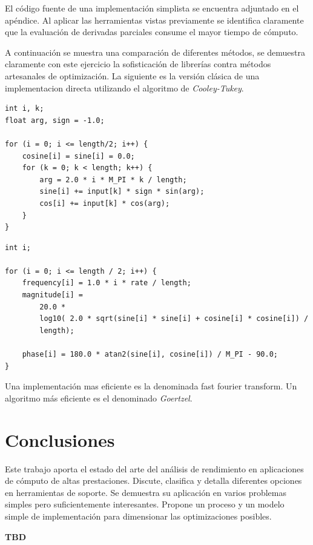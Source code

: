 \documentclass[a4paper]{report}
\begin{document}
El c\'odigo fuente de una implementaci\'on simplista se encuentra adjuntado en
el ap\'endice. Al aplicar las herramientas vistas previamente se identifica
claramente que la evaluaci\'on de derivadas parciales consume el mayor tiempo
de c\'omputo.

\bigskip

A continuaci\'on se muestra una comparaci\'on de diferentes m\'etodos, se
demuestra claramente con este ejercicio la sofisticaci\'on de librer\'ias
contra m\'etodos artesanales de optimizaci\'on. La siguiente es la versi\'on
cl\'asica de una implementacion directa utilizando el algoritmo de
{\it Cooley-Tukey}.

\begin{verbatim}
int i, k;
float arg, sign = -1.0;

for (i = 0; i <= length/2; i++) {
    cosine[i] = sine[i] = 0.0;
    for (k = 0; k < length; k++) {
        arg = 2.0 * i * M_PI * k / length;
        sine[i] += input[k] * sign * sin(arg);
        cos[i] += input[k] * cos(arg);
    }
}
\end{verbatim}

\begin{verbatim}
int i;

for (i = 0; i <= length / 2; i++) {
    frequency[i] = 1.0 * i * rate / length;
    magnitude[i] =
        20.0 *
        log10( 2.0 * sqrt(sine[i] * sine[i] + cosine[i] * cosine[i]) /
        length);

    phase[i] = 180.0 * atan2(sine[i], cosine[i]) / M_PI - 90.0;
}
\end{verbatim}

Una implementaci\'on mas eficiente es la denominada fast fourier transform.
Un algoritmo m\'as eficiente es el denominado {\it Goertzel}.

\chapter{Conclusiones}

Este trabajo aporta el estado del arte del an\'alisis de rendimiento en
aplicaciones de c\'omputo de altas prestaciones. Discute, clasifica y detalla
diferentes opciones en herramientas de soporte. Se demuestra su aplicaci\'on
en varios problemas simples pero suficientemente interesantes. Propone un
proceso y un modelo simple de implementaci\'on para dimensionar las
optimizaciones posibles.

\bigskip

{\bf TBD}
\end{document}
